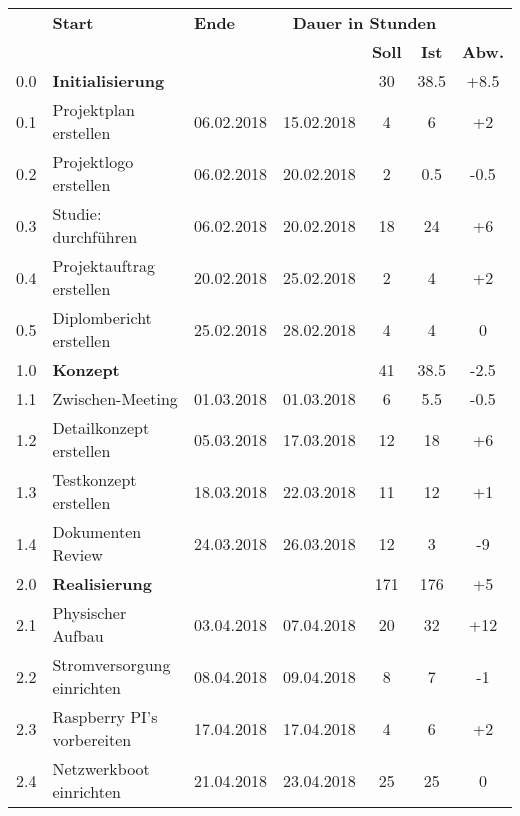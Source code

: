 \begin{table}[H]
\begin{tabular}{|p{0.7cm}p{6.8cm}p{2cm}p{2cm}|c|c|c|}
\hline
\rowcolor{heading}\multicolumn{2}{l}{\textbf{Aufgabe}} & \textbf{Start} & \textbf{Ende} & \multicolumn{3}{c|}{\textbf{Dauer in Stunden}} \\\cline{5-7} 
\rowcolor{heading}& & & & \textbf{Soll} & \textbf{Ist} & \textbf{Abw.} \\\hline
\rowcolor{subheading} 0.0 & \textbf{Initialisierung} & & & 30 & 38.5 & +8.5\\\hline
0.1 & Projektplan erstellen & 06.02.2018 & 15.02.2018  & 4 & 6 & +2 \\\hline
0.2 & Projektlogo erstellen & 06.02.2018 & 20.02.2018 & 2 & 0.5 & -0.5\\\hline
0.3 & Studie: durchführen   & 06.02.2018 & 20.02.2018 & 18 & 24 & +6\\\hline
0.4 & Projektauftrag erstellen & 20.02.2018 & 25.02.2018 & 2 & 4 & +2\\\hline
0.5 & Diplombericht erstellen  & 25.02.2018 & 28.02.2018 & 4 & 4 & 0\\\hline
\rowcolor{subheading} 1.0 &\textbf{Konzept} & & & 41 & 38.5 & -2.5 \\\hline
1.1 & Zwischen-Meeting & 01.03.2018 & 01.03.2018 & 6 & 5.5 & -0.5\\\hline
1.2 & Detailkonzept erstellen & 05.03.2018 & 17.03.2018 & 12 & 18 & +6\\\hline
1.3 & Testkonzept erstellen & 18.03.2018 & 22.03.2018 & 11 & 12 & +1\\\hline
1.4 & Dokumenten Review & 24.03.2018 & 26.03.2018  & 12 & 3 & -9 \\\hline
\hline
\rowcolor{subheading} 2.0 & \textbf{Realisierung} & & & 171 & 176 & +5\\\hline
2.1 & Physischer Aufbau & 03.04.2018 & 07.04.2018 & 20 & 32 & +12 \\\hline
2.2 & Stromversorgung einrichten & 08.04.2018 & 09.04.2018 & 8 & 7 & -1 \\\hline
2.3 & Raspberry PI's vorbereiten & 17.04.2018 & 17.04.2018 & 4 & 6 & +2 \\\hline
2.4 & Netzwerkboot einrichten & 21.04.2018 & 23.04.2018 & 25 & 25 & 0 \\\hline

\end{tabular}
\end{table}
